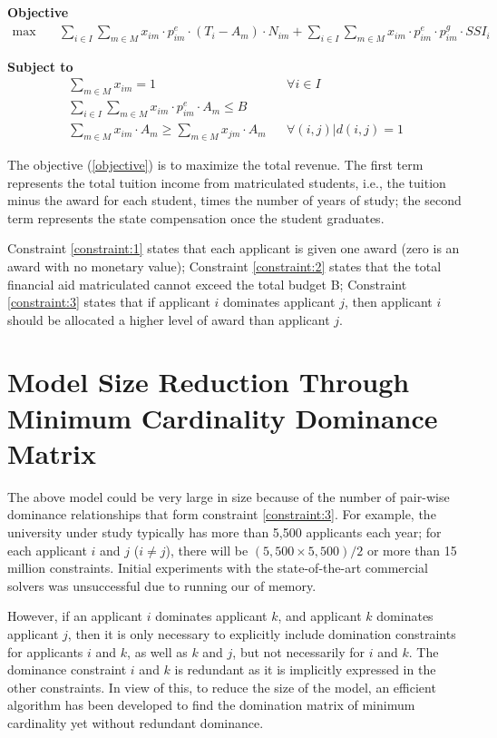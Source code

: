 \documentclass[12pt,english]{report}
\begin{document}
\hspace{-0.5cm}\textbf{Objective}
\begin{align}
\max \quad
& \sum_{i\in I} \sum_{m\in M} x_{im}\cdot p^e_{im}\cdot(T_i-A_m)\cdot N_{im}+
\sum_{i\in I} \sum_{m\in M} x_{im}\cdot p^e_{im} \cdot p^g_{im}\cdot SSI_i
\label{objective}
\end{align}

\hspace{-0.55cm}\textbf{Subject to}
\begin{align}
\sum_{m \in M}x_{im}=1 &&	\forall i\in I \label{constraint:1}  \\
\sum_{i \in I} \sum_{m\in M} x_{im}\cdot p^e_{im}\cdot A_m\leq B
\label{constraint:2}  \\
\sum_{m \in M} x_{im}\cdot A_m \geq \sum_{m \in M} x_{jm}\cdot A_m && \forall
(i,j)|d(i,j)=1 \label{constraint:3}
\end{align}

The objective (\ref{objective}) is to maximize the total revenue. The first
term represents the total tuition income from matriculated students, i.e., the
tuition minus the award for each student, times the number of years of study;
the second term represents the state compensation once the student graduates.

Constraint \ref{constraint:1}  states that each applicant is given one award
(zero is an award with no monetary value); Constraint \ref{constraint:2}
states that the total financial aid matriculated  cannot exceed the total
budget B; Constraint  \ref{constraint:3} states that if applicant $i$ dominates
applicant $j$, then applicant $i$ should be allocated a higher level of award
than applicant $j$.

\section{ Model Size Reduction Through Minimum Cardinality Dominance Matrix}

\noindent The above model could be very large in size because of the number of
pair-wise dominance relationships that form constraint \ref{constraint:3}. For
example, the university under study typically has more than 5,500 applicants
each year; for each applicant $i$ and $j$ ($i \neq j$), there will be $(5,500
\times 5,500) / 2$ or more than 15 million constraints. Initial experiments
with the state-of-the-art commercial solvers was unsuccessful due to running
our of memory.

However, if an applicant $i$ dominates applicant $k$, and applicant $k$
dominates applicant $j$, then it is only necessary to explicitly include
domination constraints for applicants $i$ and $k$, as well as $k$ and $j$, but
not necessarily for $i$ and $k$. The dominance constraint $i$ and $k$ is
redundant as it is implicitly expressed in the other constraints.  In view of
this, to reduce the size of the model, an efficient algorithm has been
developed to find the domination matrix of minimum cardinality yet without
redundant dominance.
\end{document}
